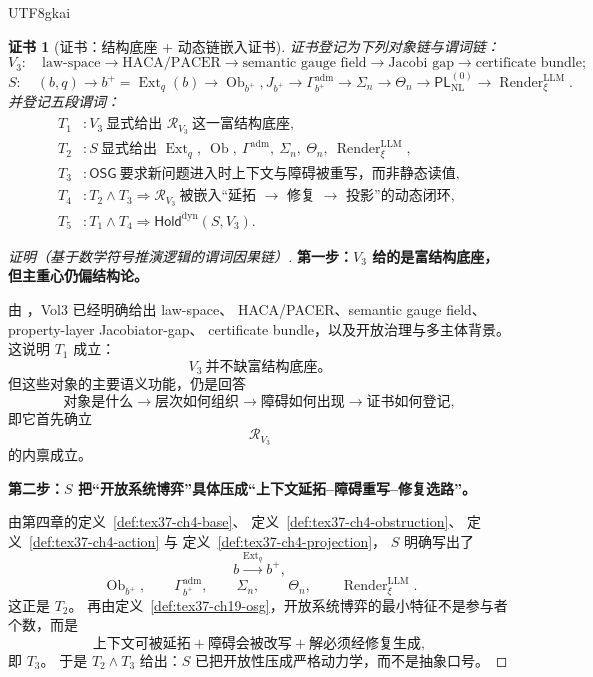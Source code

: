 \documentclass[12pt]{article}
\newtheorem{Certificate}{证书}[section]
\newcommand{\Render}{\operatorname{Render}}
\begin{document}
\begin{CJK*}{UTF8}{gkai}
\begin{Certificate}[证书：结构底座 + 动态链嵌入证书]
\label{cert:tex37-ch19-dynamic-hold}
证书登记为下列对象链与谓词链：
\[
  V_3:
  \quad
  \text{law-space}
  \to
  \text{HACA/PACER}
  \to
  \text{semantic gauge field}
  \to
  \text{Jacobi gap}
  \to
  \text{certificate bundle};
\]
\[
  S:
  \quad
  (b,q)
  \to
  b^+=\operatorname{Ext}_q(b)
  \to
  \operatorname{Ob}_{b^+},J_{b^+}
  \to
  \Gamma_{b^+}^{\mathrm{adm}}
  \to
  \Sigma_n
  \to
  \Theta_n
  \to
  \mathsf{PL}_{\mathrm{NL}}^{(0)}
  \to
  \Render^{\mathrm{LLM}}_\xi.
\]
并登记五段谓词：
\[
\begin{aligned}
  T_1 &: V_3\ \text{显式给出 }\mathcal R_{V_3}\ \text{这一富结构底座},\\
  T_2 &: S\ \text{显式给出 }\operatorname{Ext}_q,\ \operatorname{Ob},\ \Gamma^{\mathrm{adm}},\ \Sigma_n,\ \Theta_n,\
    \Render^{\mathrm{LLM}}_\xi,\\
  T_3 &: \mathsf{OSG}\ \text{要求新问题进入时上下文与障碍被重写，而非静态读值},\\
  T_4 &: T_2\wedge T_3\Rightarrow \mathcal R_{V_3}\ \text{被嵌入“延拓 }\to\text{ 修复 }\to\text{ 投影”的动态闭环},\\
  T_5 &: T_1\wedge T_4\Rightarrow \mathsf{Hold}^{\mathrm{dyn}}(S,V_3).
\end{aligned}
\]
\end{Certificate}

\begin{proof}[证明（基于数学符号推演逻辑的谓词因果链）]
\textbf{第一步：$V_3$ 给的是富结构底座，但主重心仍偏结构论。}

由 \cite{GaoZhengAppVol3,GaoZheng2025GFramework}，Vol3 已经明确给出 law-space、
HACA/PACER、semantic gauge field、property-layer Jacobiator-gap、
certificate bundle，以及开放治理与多主体背景。
这说明 $T_1$ 成立：
\[
  V_3\ \text{并不缺富结构底座。}
\]
但这些对象的主要语义功能，仍是回答
\[
  \text{对象是什么}
  \to
  \text{层次如何组织}
  \to
  \text{障碍如何出现}
  \to
  \text{证书如何登记},
\]
即它首先确立
\[
  \mathcal R_{V_3}
\]
的内禀成立。

\textbf{第二步：$S$ 把“开放系统博弈”具体压成“上下文延拓--障碍重写--修复选路”。}

由第四章的定义~\ref{def:tex37-ch4-base}、
定义~\ref{def:tex37-ch4-obstruction}、
定义~\ref{def:tex37-ch4-action} 与
定义~\ref{def:tex37-ch4-projection}，
$S$ 明确写出了
\[
  b\xrightarrow{\operatorname{Ext}_q} b^+,
\]
\[
  \operatorname{Ob}_{b^+},
  \qquad
  \Gamma_{b^+}^{\mathrm{adm}},
  \qquad
  \Sigma_n,
  \qquad
  \Theta_n,
  \qquad
  \Render^{\mathrm{LLM}}_\xi.
\]
这正是 $T_2$。
再由定义~\ref{def:tex37-ch19-osg}，开放系统博弈的最小特征不是参与者个数，而是
\[
  \text{上下文可被延拓}
  +
  \text{障碍会被改写}
  +
  \text{解必须经修复生成},
\]
即 $T_3$。
于是 $T_2\wedge T_3$ 给出：$S$ 已把开放性压成严格动力学，而不是抽象口号。


\end{proof}
\end{CJK*}
\end{document}
